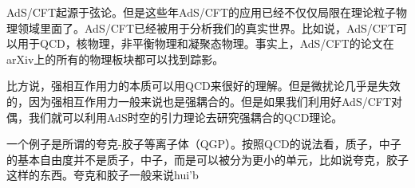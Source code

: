 
AdS/CFT起源于弦论。但是这些年AdS/CFT的应用已经不仅仅局限在理论粒子物理领域里面了。AdS/CFT已经被用于分析我们的真实世界。比如说，AdS/CFT可以用于QCD，核物理，非平衡物理和凝聚态物理。事实上，AdS/CFT的论文在arXiv上的所有的物理板块都可以找到踪影。

比方说，强相互作用力的本质可以用QCD来很好的理解。但是微扰论几乎是失效的，因为强相互作用力一般来说也是强耦合的。但是如果我们利用好AdS/CFT对偶，我们就可以利用AdS时空的引力理论去研究强耦合的QCD理论。

一个例子是所谓的夸克-胶子等离子体（QGP）。按照QCD的说法看，质子，中子的基本自由度并不是质子，中子，而是可以被分为更小的单元，比如说夸克，胶子这样的东西。夸克和胶子一般来说hui'b